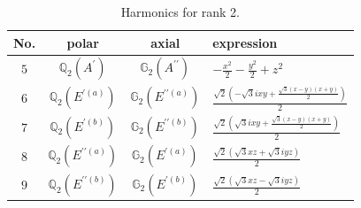 \documentclass[fleqn,8pt,landscape]{jsarticle}
\begin{document}
\begin{table}[ht!]
\begin{center}
\caption{Harmonics for rank 2.}
\renewcommand{\arraystretch}{1.3}
\begin{tabular}{cccl} \hline \hline
No. & polar & axial & expression \\ \hline
$ 5 $ & $ \mathbb{Q}_{2}(A^{\prime}) $ & $ \mathbb{G}_{2}(A^{\prime\prime}) $ & $ - \frac{x^{2}}{2} - \frac{y^{2}}{2} + z^{2} $ \\
$ 6 $ & $ \mathbb{Q}_{2}(E^{\prime(a)}) $ & $ \mathbb{G}_{2}(E^{\prime\prime(a)}) $ & $ \frac{\sqrt{2} \left(- \sqrt{3} i x y + \frac{\sqrt{3} \left(x - y\right) \left(x + y\right)}{2}\right)}{2} $ \\
$ 7 $ & $ \mathbb{Q}_{2}(E^{\prime(b)}) $ & $ \mathbb{G}_{2}(E^{\prime\prime(b)}) $ & $ \frac{\sqrt{2} \left(\sqrt{3} i x y + \frac{\sqrt{3} \left(x - y\right) \left(x + y\right)}{2}\right)}{2} $ \\
$ 8 $ & $ \mathbb{Q}_{2}(E^{\prime\prime(a)}) $ & $ \mathbb{G}_{2}(E^{\prime(a)}) $ & $ \frac{\sqrt{2} \left(\sqrt{3} x z + \sqrt{3} i y z\right)}{2} $ \\
$ 9 $ & $ \mathbb{Q}_{2}(E^{\prime\prime(b)}) $ & $ \mathbb{G}_{2}(E^{\prime(b)}) $ & $ \frac{\sqrt{2} \left(\sqrt{3} x z - \sqrt{3} i y z\right)}{2} $ \\
 \hline \hline
\end{tabular}
\end{center}
\end{table}
\end{document}
